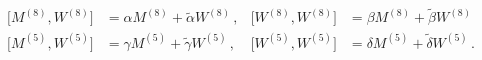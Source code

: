 \begin{equation}
\begin{aligned}
{}\big[M^{(8)},W^{(8)}\big] &= \alpha M^{(8)} + \tilde{\alpha} W^{(8)} \,,
&  \big[W^{(8)},W^{(8)}\big] &= \beta M^{(8)} + \tilde{\beta} W^{(8)} \\
{}\big[M^{(5)},W^{(5)}\big] &= \gamma M^{(5)} + \tilde{\gamma} W^{(5)} \,,
& \big[W^{(5)},W^{(5)}\big] &= \delta M^{(5)} + \tilde{\delta} W^{(5)}  \, .
\end{aligned}
\end{equation}

